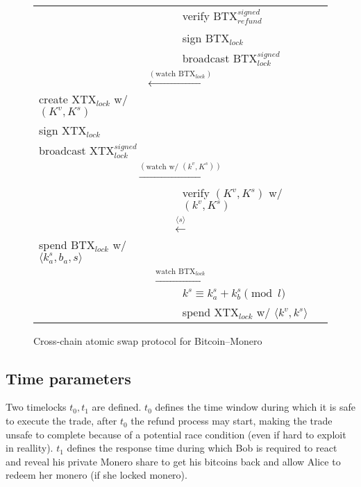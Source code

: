 \documentclass{llncs}
\begin{document}
\begin{figure}[T]
\begin{table}[H]
{\begin{tabular}{ | l l l | }
          & & verify $\text{BTX}_\textit{refund}^\textit{signed}$ \\
          & & sign $\text{BTX}_\textit{lock}$ \\
          & & broadcast $\text{BTX}_\textit{lock}^\textit{signed}$ \\
          \multicolumn{3}{|c|}{$\xleftarrow{(\text{watch BTX}_\textit{lock})}$} \\
          create $\text{XTX}_\textit{lock}$ w/ $(K^v, K^s)$ & & \\
          sign $\text{XTX}_\textit{lock}$ & & \\
          broadcast $\text{XTX}_\textit{lock}^\textit{signed}$ & & \\
          \multicolumn{3}{|c|}{$\xrightarrow{(\text{watch w/ } (k^v, K^s))}$} \\
          & & verify $(K^v, K^s)$ w/ $(k^v, K^s)$ \\
          \multicolumn{3}{|c|}{$\xleftarrow{\langle s \rangle}$} \\
          spend $\text{BTX}_\textit{lock}$ w/ $\langle k^s_a, b_a, s \rangle$ & & \\
          \multicolumn{3}{|c|}{$\xrightarrow{\text{watch BTX}_\textit{lock}}$} \\
          & & $k^s \equiv k^s_a + k^s_b \pmod l$ \\
          & & spend $\text{XTX}_\textit{lock}$ w/ $\langle k^v, k^s \rangle$ \\
        \hline
      \end{tabular}}
    \end{table}
  \caption{Cross-chain atomic swap protocol for Bitcoin--Monero}
  \label{fig:protocol}
\end{figure}

\subsection{Time parameters}
Two timelocks $t_0, t_1$ are defined. $t_0$ defines the time window during which it is safe to execute the trade, after $t_0$ the refund process may start, making the trade unsafe to complete because of a potential race condition (even if hard to exploit in reallity). $t_1$ defines the response time during which Bob is required to react and reveal his private Monero share to get his bitcoins back and allow Alice to redeem her monero (if she locked monero).
\end{document}
